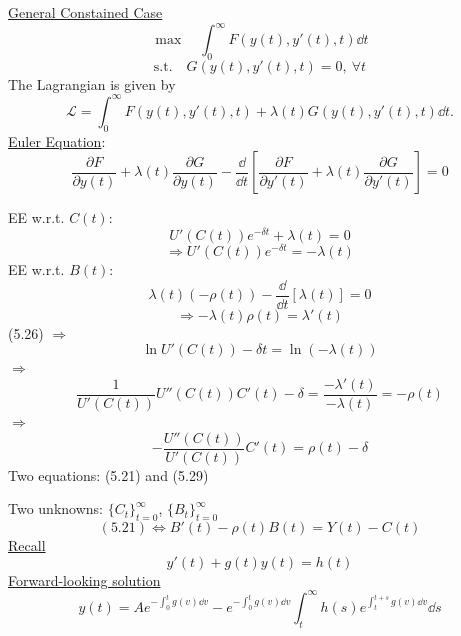 \documentclass[twoside]{article}
\newcommand\pd{\partial}
\newcommand\imp{$\Longrightarrow$}
\begin{document}
\underline{General Constained Case}
\begin{equation}
    \max \quad \int_0^{\infty} F(y(t),y'(t),t) \dd t
\end{equation}
\begin{equation}
    \text{s.t.} \quad G(y(t),y'(t),t) = 0, ~\forall t
\end{equation}
The Lagrangian is given by 
$$\mathcal{L} = \int_0^{\infty} F(y(t),y'(t),t) + \lambda(t) G(y(t),y'(t),t) \dd t.$$
\underline{Euler Equation}:
\begin{equation}
    \frac{\pd F}{\pd y(t)} + \lambda(t) \frac{\pd G}{\pd y(t)} - \frac{\dd }{\dd t}\left [ \frac{\pd F}{\pd y'(t)} + \lambda(t) \frac{\pd G}{\pd y'(t)} \right ] = 0
\end{equation}


EE w.r.t. $C(t)$:
\begin{equation}
    U'(C(t))e^{-\delta t} + \lambda(t) = 0
\end{equation}
\begin{equation}
    \Longrightarrow 
    U'(C(t))e^{-\delta t} = - \lambda(t)
\end{equation}
EE w.r.t. $B(t)$:
\begin{equation}
    \lambda(t)(-\rho(t)) - \frac{\dd}{\dd t}[\lambda(t)] = 0
\end{equation}
\begin{equation}
    \Longrightarrow 
    - \lambda(t)\rho(t) = \lambda'(t) 
\end{equation}
(5.26) \imp $$\ln U'(C(t)) - \delta t= \ln (-\lambda(t))$$ \imp $$\frac{1}{U'(C(t))}U''(C(t))C'(t) - \delta = \frac{-\lambda'(t)}{-\lambda(t)} = -\rho(t) $$ 
\imp
\begin{equation}
    - \frac{U''(C(t))}{U'(C(t))}C'(t) = \rho(t) - \delta
\end{equation}
Two equations: (5.21) and (5.29)

Two unknowns: $\{ C_t\}_{t=0}^{\infty}$, $\{ B_t\}_{t=0}^{\infty}$
\begin{equation}
    (5.21) \iff B'(t) - \rho(t)B(t) = Y(t) - C(t) 
\end{equation}
\underline{Recall}
\begin{equation}
    y'(t) + g(t) y(t) = h(t)
\end{equation}
\underline{Forward-looking solution}
\begin{equation}
    y(t) = A e^{-\int_0^t g(v) \dd v } - e^{-\int_0^t g(v) \dd v }\int_t^{\infty} h(s) e^{\int_t^{t+s} g(v) \dd v } \dd s
\end{equation}
 
\end{document}
